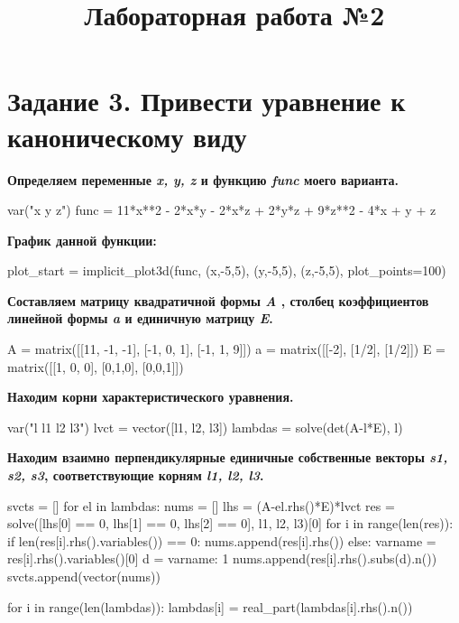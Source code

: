 \documentclass{article}
\title{\textbf{Лабораторная работа №2}}
\begin{document}
\maketitle

\section*{Задание 3. Привести уравнение к каноническому виду}
\textbf{Определяем переменные \textit{x, y, z} и функцию \textit{func} моего варианта.}
\begin{sageblock}
var("x y z")
func = 11*x**2 - 2*x*y - 2*x*z + 2*y*z + 9*z**2 - 4*x + y + z
\end{sageblock}
\textbf{График данной функции:} 
\begin{sageblock}
plot_start = implicit_plot3d(func, (x,-5,5), (y,-5,5), (z,-5,5), plot_points=100)
\end{sageblock}

\textbf{Составляем матрицу квадратичной формы \textit{A} , столбец коэффициентов линейной формы \textit{a} и единичную матрицу \textit{E}.}

\begin{sageblock}
A = matrix([[11, -1, -1], [-1, 0, 1], [-1, 1, 9]])
a = matrix([[-2], [1/2], [1/2]])
E = matrix([[1, 0, 0], [0,1,0], [0,0,1]])
\end{sageblock}

\textbf{Находим корни характеристического уравнения.}
\begin{sageblock}
var("l l1 l2 l3")
lvct = vector([l1, l2, l3])
lambdas = solve(det(A-l*E), l)
\end{sageblock}


\textbf{Находим взаимно перпендикулярные единичные собственные векторы \textit{s1, s2, s3}, соответствующие корням \textit{l1, l2, l3}.}
\begin{sageblock}
svcts = []
for el in lambdas:
    nums = []
    lhs = (A-el.rhs()*E)*lvct
    res = solve([lhs[0] == 0, lhs[1] == 0, lhs[2] == 0], l1, l2, l3)[0]   
    for i in range(len(res)):
        if len(res[i].rhs().variables()) == 0:
            nums.append(res[i].rhs())
        else:
            varname = res[i].rhs().variables()[0]
            d = {varname: 1}
            nums.append(res[i].rhs().subs(d).n())
    svcts.append(vector(nums))
    
for i in range(len(lambdas)):
    lambdas[i] = real_part(lambdas[i].rhs().n())
\end{sageblock}
\end{document}
